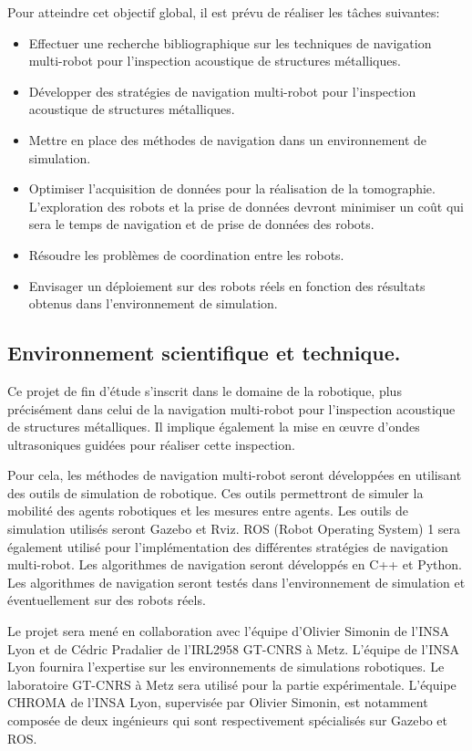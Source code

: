 \documentclass[init,francais,RandD]{rapportPFE}
\begin{document}
			Pour atteindre cet objectif global, il est prévu de réaliser les tâches suivantes:
			\begin{itemize}
				\item Effectuer une recherche bibliographique sur les techniques de navigation multi-robot pour l'inspection acoustique de structures métalliques.
				\item Développer des stratégies de navigation multi-robot pour l'inspection acoustique de structures métalliques.
				\item Mettre en place des méthodes de navigation dans un environnement de simulation.
				\item Optimiser l'acquisition de données pour la réalisation de la tomographie. L'exploration des robots et la prise de données devront minimiser un coût qui sera le temps de navigation et de prise de données des robots.
				\item Résoudre les problèmes de coordination entre les robots.
				\item Envisager un déploiement sur des robots réels en fonction des résultats obtenus dans l'environnement de simulation.
			\end{itemize}
		\subsection{Environnement scientifique et technique.}
			Ce projet de fin d'étude s'inscrit dans le domaine de la robotique, plus précisément dans celui de la navigation multi-robot pour l'inspection acoustique de structures métalliques. Il implique également la mise en œuvre d'ondes ultrasoniques guidées pour réaliser cette inspection.

			Pour cela, les méthodes de navigation multi-robot seront développées en utilisant des outils de simulation de robotique. Ces outils permettront de simuler la mobilité des agents robotiques et les mesures entre agents. Les outils de simulation utilisés seront Gazebo et Rviz. ROS (Robot Operating System) 1 sera également utilisé pour l'implémentation des différentes stratégies de navigation multi-robot. Les algorithmes de navigation seront développés en C++ et Python. Les algorithmes de navigation seront testés dans l'environnement de simulation et éventuellement sur des robots réels.

			Le projet sera mené en collaboration avec l'équipe d'Olivier Simonin de l'INSA Lyon et de Cédric Pradalier de l'IRL2958 GT-CNRS à Metz. L'équipe de l'INSA Lyon fournira l'expertise sur les environnements de simulations robotiques. Le laboratoire GT-CNRS à Metz sera utilisé pour la partie expérimentale. L'équipe CHROMA de l'INSA Lyon, supervisée par Olivier Simonin, est notamment composée de deux ingénieurs qui sont respectivement spécialisés sur Gazebo et ROS.
\end{document}
